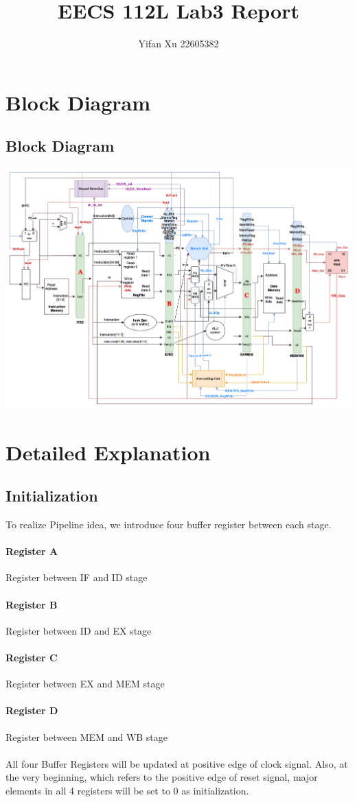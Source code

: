 \documentclass{article}
\author{Yifan Xu 22605382}
\title{EECS 112L Lab3 Report}
\begin{document}
	\maketitle
	\section{Block Diagram}
	\subsection{Block Diagram} 
	\includegraphics[scale=0.37]{PipeLine.png}
	\section{Detailed Explanation}
	\subsection{Initialization}
	To realize Pipeline idea, we introduce four buffer register between each stage.
	\paragraph{Register A} Register between IF and ID stage
	\paragraph{Register B} Register between ID and EX stage
	\paragraph{Register C} Register between EX and MEM stage
	\paragraph{Register D} Register between MEM and WB stage \\ \\
	All four Buffer Registers will be updated at positive edge of clock signal. Also, at the very beginning, which refers to the positive edge of reset signal, major elements in all 4 registers will be set to 0 as initialization.
\end{document}
